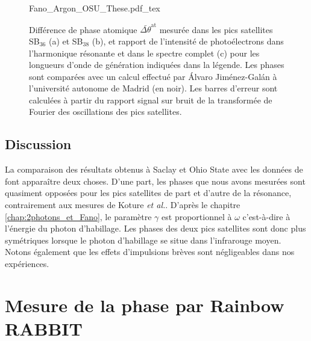 \begin{figure}
\centering
\def\svgwidth{1\textwidth}
{Fano_Argon_OSU_These.pdf_tex}
\caption{Différence de phase atomique $\bar{\Delta \theta}^{\text{at}}$ mesurée dans les pics satellites SB$_{36}$ (a) et SB$_{38}$ (b), et rapport de l'intensité de photoélectrons dans l'harmonique résonante et dans le spectre complet (c) pour les longueurs d'onde de génération indiquées dans la légende. Les phases sont comparées avec un calcul effectué par \'{A}lvaro Jiménez-Gal\'{a}n à l'université autonome de Madrid (en noir). Les barres d'erreur sont calculées à partir du rapport signal sur bruit de la transformée de Fourier des oscillations des pics satellites.}
\label{fig:Phases_Argon_OSU}
\end{figure}

\subsection{Discussion}
La comparaison des résultats obtenus à Saclay et Ohio State avec les données de  font apparaître deux choses. D'une part, les phases que nous avons mesurées sont quasiment opposées pour les pics satellites de part et d'autre de la résonance, contrairement aux mesures de Koture \textit{et al.}. D'après le chapitre \ref{chap:2photons_et_Fano}, le paramètre $\gamma$ est proportionnel à $\omega$ c'est-à-dire à l'énergie du photon d'habillage. Les phases des deux pics satellites sont donc plus symétriques lorsque le photon d'habillage se situe dans l'infrarouge moyen. Notons également que les effets d'impulsions brèves sont négligeables dans nos expériences. 



\section{Mesure de la phase par Rainbow RABBIT}



